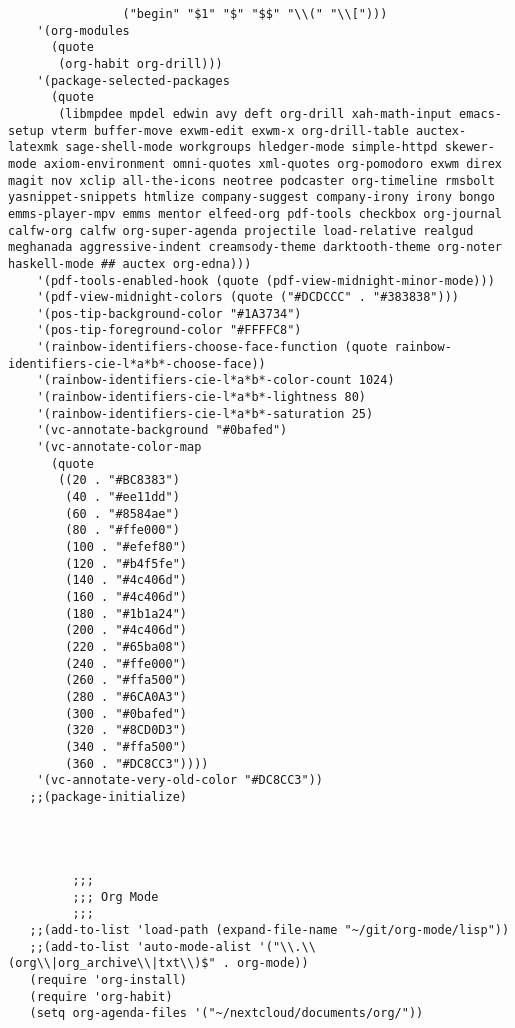 \documentclass[11pt]{article}
\begin{document}
\begin{verbatim}
                ("begin" "$1" "$" "$$" "\\(" "\\[")))
    '(org-modules
      (quote
       (org-habit org-drill)))
    '(package-selected-packages
      (quote
       (libmpdee mpdel edwin avy deft org-drill xah-math-input emacs-setup vterm buffer-move exwm-edit exwm-x org-drill-table auctex-latexmk sage-shell-mode workgroups hledger-mode simple-httpd skewer-mode axiom-environment omni-quotes xml-quotes org-pomodoro exwm direx magit nov xclip all-the-icons neotree podcaster org-timeline rmsbolt yasnippet-snippets htmlize company-suggest company-irony irony bongo emms-player-mpv emms mentor elfeed-org pdf-tools checkbox org-journal calfw-org calfw org-super-agenda projectile load-relative realgud meghanada aggressive-indent creamsody-theme darktooth-theme org-noter haskell-mode ## auctex org-edna)))
    '(pdf-tools-enabled-hook (quote (pdf-view-midnight-minor-mode)))
    '(pdf-view-midnight-colors (quote ("#DCDCCC" . "#383838")))
    '(pos-tip-background-color "#1A3734")
    '(pos-tip-foreground-color "#FFFFC8")
    '(rainbow-identifiers-choose-face-function (quote rainbow-identifiers-cie-l*a*b*-choose-face))
    '(rainbow-identifiers-cie-l*a*b*-color-count 1024)
    '(rainbow-identifiers-cie-l*a*b*-lightness 80)
    '(rainbow-identifiers-cie-l*a*b*-saturation 25)
    '(vc-annotate-background "#0bafed")
    '(vc-annotate-color-map
      (quote
       ((20 . "#BC8383")
        (40 . "#ee11dd")
        (60 . "#8584ae")
        (80 . "#ffe000")
        (100 . "#efef80")
        (120 . "#b4f5fe")
        (140 . "#4c406d")
        (160 . "#4c406d")
        (180 . "#1b1a24")
        (200 . "#4c406d")
        (220 . "#65ba08")
        (240 . "#ffe000")
        (260 . "#ffa500")
        (280 . "#6CA0A3")
        (300 . "#0bafed")
        (320 . "#8CD0D3")
        (340 . "#ffa500")
        (360 . "#DC8CC3"))))
    '(vc-annotate-very-old-color "#DC8CC3"))
   ;;(package-initialize)




         ;;;
         ;;; Org Mode
         ;;;
   ;;(add-to-list 'load-path (expand-file-name "~/git/org-mode/lisp"))
   ;;(add-to-list 'auto-mode-alist '("\\.\\(org\\|org_archive\\|txt\\)$" . org-mode))
   (require 'org-install)
   (require 'org-habit)
   (setq org-agenda-files '("~/nextcloud/documents/org/"))



\end{verbatim}
\end{document}
